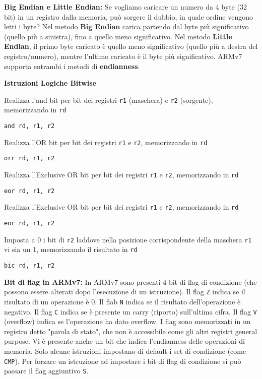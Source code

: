 \begin{defn}
\textbf{Big Endian e Little Endian:} Se vogliamo caricare un numero da 4 byte (32 bit) in un registro dalla memoria, può sorgere il dubbio, in quale ordine vengono letti i byte? Nel metodo \textbf{Big Endian} carica partendo dal byte più significativo (quello più a sinistra), fino a quello meno significativo. Nel metodo \textbf{Little Endian}, il primo byte caricato è quello meno significativo (quello più a destra del registro/numero), mentre l'ultimo caricato è il byte più significativo. ARMv7 supporta entrambi i metodi di \textbf{endianness}.
\end{defn}

\begin{defn}
\textbf{Istruzioni Logiche Bitwise}

Realizza l'and bit per bit dei registri \verb|r1| (maschera) e \verb|r2| (sorgente), memorizzando in \verb|rd|
\begin{lstlisting}[style=arm]
and rd, r1, r2
\end{lstlisting}

Realizza l'OR bit per bit dei registri \verb|r1| e \verb|r2|, memorizzando in \verb|rd|
\begin{lstlisting}[style=arm]
orr rd, r1, r2
\end{lstlisting}

Realizza l'Exclusive OR bit per bit dei registri \verb|r1| e \verb|r2|, memorizzando in \verb|rd|
\begin{lstlisting}[style=arm]
eor rd, r1, r2
\end{lstlisting}

Realizza l'Exclusive OR bit per bit dei registri \verb|r1| e \verb|r2|, memorizzando in \verb|rd|
\begin{lstlisting}[style=arm]
eor rd, r1, r2
\end{lstlisting}

Imposta a 0 i bit di \verb|r2| laddove nella posizione corrispondente della maschera \verb|r1| vi sia un 1, memorizzando il risultato in \verb|rd|
\begin{lstlisting}[style=arm]
bic rd, r1, r2
\end{lstlisting}
\end{defn}

\begin{defn}
\textbf{Bit di flag in ARMv7:}
In ARMv7 sono presenti 4 bit di flag di condizione (che possono essere alterati dopo l'esecuzione di un istruzione). Il flag \verb|Z| indica se il risultato di un operazione è 0. Il flab \verb|N| indica se il risultato dell'operazione è negativo. Il flag \verb|C| indica se è presente un carry (riporto) sull'ultima cifra. Il flag \verb|V| (overflow) indica se l'operazione ha dato overflow. I flag sono memorizzati in un registro detto "parola di stato", che non è accessibile come gli altri registri general purpose. Vi è presente anche un bit che indica l'endianness delle operazioni di memoria.
Solo alcune istruzioni impostano di default i set di condizione (come \verb|CMP|). Per forzare un istruzione ad impostare i bit di flag di condizione si può passare il flag aggiuntivo \verb|S|.
\end{defn}

